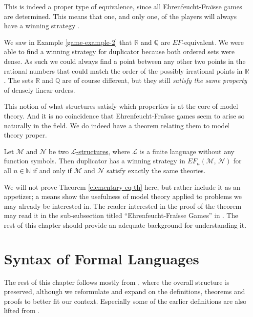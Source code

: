 \documentclass[../../main.tex]{subfiles}
\begin{document}
This is indeed a proper type of equivalence, since all Ehrenfeucht-Fra\"isse games are determined.
This means that one, and only one, of the players will always have a winning strategy \cite[\S 6]{Wil24}.

We saw in Example \ref{game-example-2} that $\mathbb{R}$ and $\mathbb{Q}$ are $EF$-equivalent.
We were able to find a winning strategy for duplicator because both ordered sets were dense. 
As such we could always find a point between any other two points in the rational numbers that could match the order of the possibly irrational points in $\mathbb{R}$.
The sets $\mathbb{R}$ and $\mathbb{Q}$ are of course different, but they still \textit{satisfy the same property} of densely linear orders.

This notion of what structures satisfy which properties is at the core of model theory.
And it is no coincidence that Ehrenfeucht-Fra\"isse games seem to arise so naturally in the field. 
We do indeed have a theorem relating them to model theory proper.

\begin{theorem}\label{elementary-eq-th}\cite[Theorem 2.4.6]{Mar02}
    Let $\mathcal{M}$ and $\mathcal{N}$ be two \hyperref[structure-def]{$\mathcal{L}$-structures}, where $\mathcal{L}$ is a finite language without any function symbols.
    Then duplicator has a winning strategy in $EF_n(\mathcal{M},\, \mathcal{N})$ for all $n \in \mathbb{N}$ if and only if $\mathcal{M}$ and $\mathcal{N}$ satisfy exactly the same theories.
\end{theorem}
 
We will not prove Theorem \ref{elementary-eq-th} here, but rather include it as an appetizer;
a means show the usefulness of model theory applied to problems we may already be interested in.
The reader interested in the proof of the theorem may read it in the sub-subsection titled ``Ehrenfeucht-Fra\"isse Games'' in \cite[\S 2.4]{Mar02}.
The rest of this chapter should provide an adequate background for understanding it.
 
\section{Syntax of Formal Languages}
The rest of this chapter follows mostly from \cite[\S\S 1.3, 1.4, 2.1]{Cha90}, where the overall structure is preserved, 
although we reformulate and expand on the definitions, theorems and proofs to better fit our context.
Especially some of the earlier definitions are also lifted from \cite{Mar02}.
\end{document}
